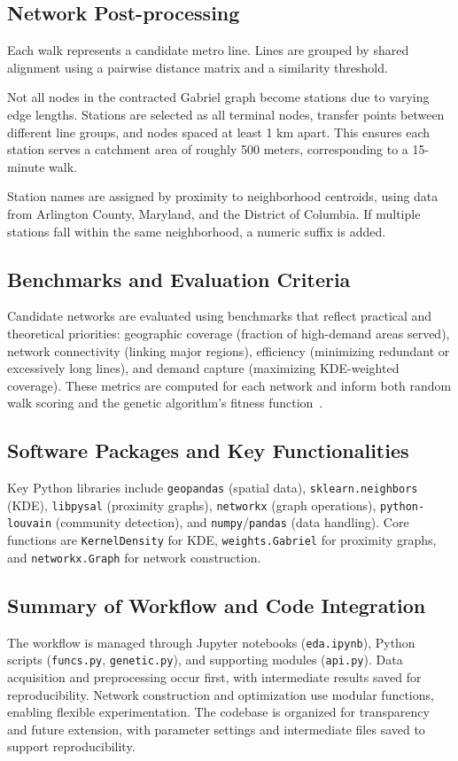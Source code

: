\documentclass[manuscript]{acmart}
\begin{document}
\subsection{Network Post-processing}
Each walk represents a candidate metro line. Lines are grouped by shared alignment using a pairwise distance matrix and a similarity threshold.

Not all nodes in the contracted Gabriel graph become stations due to varying edge lengths. Stations are selected as all terminal nodes, transfer points between different line groups, and nodes spaced at least 1 km apart. This ensures each station serves a catchment area of roughly 500 meters, corresponding to a 15-minute walk.

Station names are assigned by proximity to neighborhood centroids, using data from Arlington County, Maryland, and the District of Columbia. If multiple stations fall within the same neighborhood, a numeric suffix is added.

\subsection{Benchmarks and Evaluation Criteria}
Candidate networks are evaluated using benchmarks that reflect practical and theoretical priorities: geographic coverage (fraction of high-demand areas served), network connectivity (linking major regions), efficiency (minimizing redundant or excessively long lines), and demand capture (maximizing KDE-weighted coverage). These metrics are computed for each network and inform both random walk scoring and the genetic algorithm's fitness function~\cite{bib:bast2016route, bib:overview-field}.

\subsection{Software Packages and Key Functionalities}
Key Python libraries include \texttt{geopandas} (spatial data), \texttt{sklearn.neighbors} (KDE), \texttt{libpysal} (proximity graphs), \texttt{networkx} (graph operations), \texttt{python-louvain} (community detection), and \texttt{numpy}/\texttt{pandas} (data handling). Core functions are \texttt{KernelDensity} for KDE, \texttt{weights.Gabriel} for proximity graphs, and \texttt{networkx.Graph} for network construction.

\subsection{Summary of Workflow and Code Integration}
The workflow is managed through Jupyter notebooks (\texttt{eda.ipynb}), Python scripts (\texttt{funcs.py}, \texttt{genetic.py}), and supporting modules (\texttt{api.py}). Data acquisition and preprocessing occur first, with intermediate results saved for reproducibility. Network construction and optimization use modular functions, enabling flexible experimentation. The codebase is organized for transparency and future extension, with parameter settings and intermediate files saved to support reproducibility.
\end{document}
